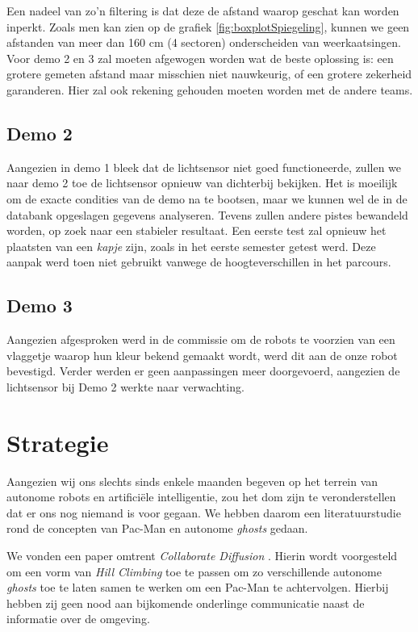 \documentclass[12pt,a4paper]{report}
\begin{document}
Een nadeel van zo'n filtering is dat deze de afstand waarop geschat kan worden inperkt. Zoals men kan zien op de grafiek \ref{fig:boxplotSpiegeling}, kunnen we geen afstanden van meer dan 160 cm (4 sectoren) onderscheiden van weerkaatsingen. Voor demo 2 en 3 zal moeten afgewogen worden wat de beste oplossing is: een grotere gemeten afstand maar misschien niet nauwkeurig, of een grotere zekerheid garanderen. Hier zal ook rekening gehouden moeten worden met de andere teams. 

\section{Demo 2}

Aangezien in demo 1 bleek dat de lichtsensor niet goed functioneerde, zullen we naar demo 2 toe de lichtsensor opnieuw van dichterbij bekijken. Het is moeilijk om de exacte condities van de demo na te bootsen, maar we kunnen wel de in de databank opgeslagen gegevens analyseren. Tevens zullen andere pistes bewandeld worden, op zoek naar een stabieler resultaat. Een eerste test zal opnieuw het plaatsten van een \emph{kapje} zijn, zoals in het eerste semester getest werd. Deze aanpak werd toen niet gebruikt vanwege de hoogteverschillen in het parcours. 

\section{Demo 3}

Aangezien afgesproken werd in de commissie om de robots te voorzien van een vlaggetje waarop hun kleur bekend gemaakt wordt, werd dit aan de onze robot bevestigd. Verder werden er geen aanpassingen meer doorgevoerd, aangezien de lichtsensor bij Demo 2 werkte naar verwachting.

\chapter{Strategie}

Aangezien wij ons slechts sinds enkele maanden begeven op het terrein van autonome robots en artifici\"ele intelligentie, zou het dom zijn te veronderstellen dat er ons nog niemand is voor gegaan. We hebben daarom een literatuurstudie rond de concepten van Pac-Man en autonome \emph{ghosts} gedaan.

We vonden een paper omtrent \emph{Collaborate Diffusion} \cite{Repenning06}. Hierin wordt voorgesteld om een vorm van \emph{Hill Climbing} toe te passen om zo verschillende autonome \emph{ghosts} toe te laten samen te werken om een Pac-Man te achtervolgen. Hierbij hebben zij geen nood aan bijkomende onderlinge communicatie naast de informatie over de omgeving.
\end{document}
